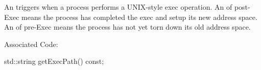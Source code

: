 
An  triggers when a process performs a UNIX-style exec
operation. An  of post-Exec means the process has completed the
exec and setup its new address space. An  of pre-Exec means the
process has not yet torn down its old address space.

Associated  Code: 

\begin{apient}
std::string getExecPath() const;
\end{apient}

